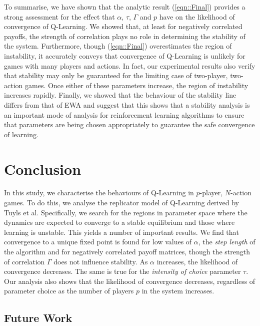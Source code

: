 \documentclass[sigconf,anonymous]{aamas}
\begin{document}
To summarise, we have shown that the analytic result
(\ref{eqn::Final}) provides a strong assessment for the effect that
$\alpha$, $\tau$, $\Gamma$ and $p$ have on the likelihood of
convergence of Q-Learning. We showed that, at least for negatively
correlated payoffs, the strength of correlation plays no role in
determining the stability of the system. Furthermore, though
(\ref{eqn::Final}) overestimates the region of instability, it
accurately conveys that convergence of Q-Learning is unlikely for
games with many players and actions. In fact, our experimental results
also verify that stability may only be guaranteed for the limiting
case of two-player, two-action games. Once either of these parameters increase, the region of instability increases rapidly.
%
Finally, we showed that the behaviour of the stability line differs
from that of EWA and suggest that this shows that a stability analysis
is an important mode of analysis for reinforcement learning algorithms
to ensure that parameters are being chosen appropriately to guarantee
the safe convergence of learning.



\section{Conclusion}

In this study, we characterise the behaviours of Q-Learning in $p$-player, $N$-action games. To do this, we analyse the replicator model of Q-Learning derived by Tuyls et al. Specifically, we search for the regions in parameter space where the dynamics are expected to converge to a stable equilibrium and those where learning is unstable. This yields a number of important results. We find that convergence to a unique fixed point is found for low values of $\alpha$, the \textit{step length} of the algorithm and for negatively correlated payoff matrices, though the strength of correlation $\Gamma$ does not influence stability. As $\alpha$ increases, the likelihood of convergence decreases. The same is true for the \textit{intensity of choice} parameter $\tau$. Our analysis also shows that the likelihood of convergence decreases, regardless of parameter choice as the number of players $p$ in the system increases.

\subsection*{Future Work}
\end{document}

